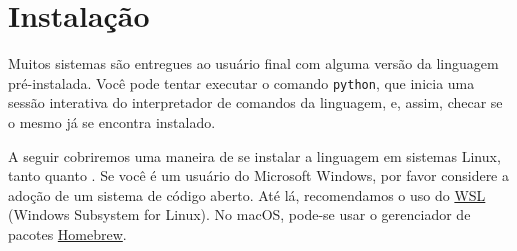 \chapter{Instalação}\label{chp:instalação}

Muitos sistemas são entregues ao usuário final com alguma versão da linguagem
\python{} pré-instalada. Você pode tentar executar o comando \texttt{python},
que inicia uma sessão interativa do interpretador de comandos da linguagem, e,
assim, checar se o mesmo já se encontra instalado.

A seguir cobriremos uma maneira de se instalar a linguagem em sistemas Linux,
tanto \debiangnulinux{} quanto \fedoraproject. Se  você é um usuário do
Microsoft Windows, por favor considere a adoção de um sistema de código aberto.
Até lá, recomendamos o uso do
\href{https://learn.microsoft.com/en-us/windows/wsl/about}{WSL} (Windows
Subsystem for Linux). No macOS, pode-se usar o gerenciador de pacotes
\href{https://brew.sh}{Homebrew}.

